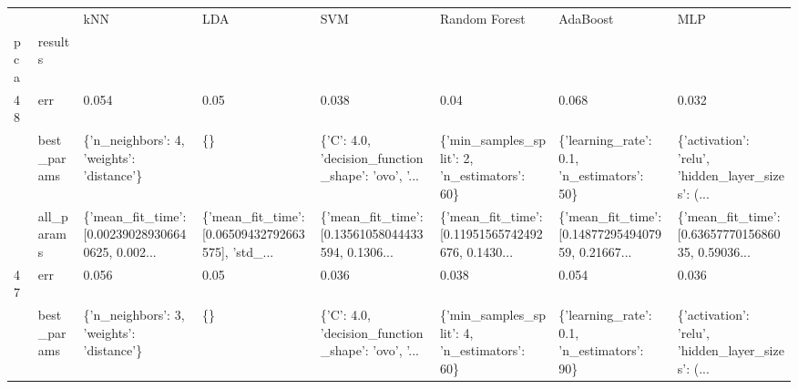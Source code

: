 \begin{tabular}{llllllll}
\toprule
   &            &                                                kNN &                                                LDA &                                                SVM &                                      Random Forest &                                           AdaBoost &                                                MLP \\
pca & results &                                                    &                                                    &                                                    &                                                    &                                                    &                                                    \\
\midrule
48 & err &                                              0.054 &                                               0.05 &                                              0.038 &                                               0.04 &                                              0.068 &                                              0.032 \\
   & best\_params &          \{'n\_neighbors': 4, 'weights': 'distance'\} &                                                 \{\} &  \{'C': 4.0, 'decision\_function\_shape': 'ovo', '... &       \{'min\_samples\_split': 2, 'n\_estimators': 60\} &         \{'learning\_rate': 0.1, 'n\_estimators': 50\} &  \{'activation': 'relu', 'hidden\_layer\_sizes': (... \\
   & all\_params &  \{'mean\_fit\_time': [0.002390289306640625, 0.002... &  \{'mean\_fit\_time': [0.06509432792663575], 'std\_... &  \{'mean\_fit\_time': [0.13561058044433594, 0.1306... &  \{'mean\_fit\_time': [0.11951565742492676, 0.1430... &  \{'mean\_fit\_time': [0.1487729549407959, 0.21667... &  \{'mean\_fit\_time': [0.6365777015686035, 0.59036... \\
47 & err &                                              0.056 &                                               0.05 &                                              0.036 &                                              0.038 &                                              0.054 &                                              0.036 \\
   & best\_params &          \{'n\_neighbors': 3, 'weights': 'distance'\} &                                                 \{\} &  \{'C': 4.0, 'decision\_function\_shape': 'ovo', '... &       \{'min\_samples\_split': 4, 'n\_estimators': 60\} &         \{'learning\_rate': 0.1, 'n\_estimators': 90\} &  \{'activation': 'relu', 'hidden\_layer\_sizes': (... \\

\end{tabular}
